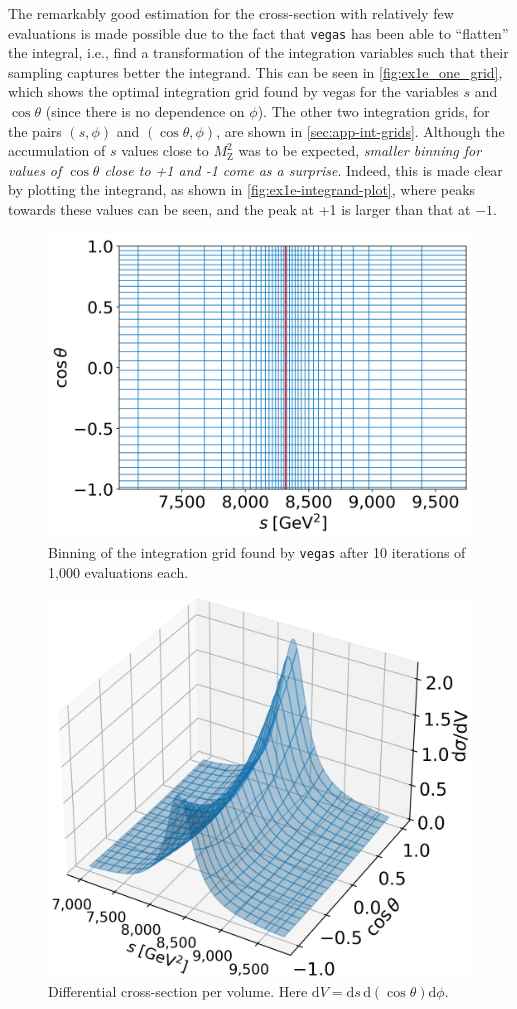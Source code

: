 The remarkably good estimation for the cross-section with relatively few evaluations is made possible due to the fact that \texttt{vegas} has been able to “flatten” the integral, i.e., find a transformation of the integration variables such that their sampling captures better the integrand. This can be seen in \autoref{fig:ex1e_one_grid}, which shows the optimal integration grid found by vegas for the variables $s$ and $\cos{\theta}$ (since there is no dependence on $\phi$). The other two integration grids, for the pairs $(s, \phi)$ and $(\cos{\theta}, \phi)$, are shown in \autoref{sec:app-int-grids}. Although the accumulation of $s$ values close to $M_{\text{Z}}^{2}$ was to be expected,  \emph{smaller binning for values of $\cos{\theta}$ close to +1 and -1 come as a surprise}. Indeed, this is made clear by plotting the integrand, as shown in \autoref{fig:ex1e-integrand-plot}, where peaks towards these values can be seen, and the peak at +1 is larger than that at $-1$.

\begin{figure}[ht!]
    \centering
    \includegraphics[width=0.6\linewidth]{figures/integration_grid_0.png}
    \caption{Binning of the integration grid found by \texttt{vegas} after 10 iterations of 1,000 evaluations each.}
    \label{fig:ex1e_one_grid}
\end{figure}

\begin{figure}
    \centering
    \includegraphics[width=0.6\linewidth]{figures/integrand_plot.png}
    \caption{Differential cross-section per volume. Here $\mathrm{d}V = \mathrm{d}s \, \mathrm{d}(\cos{\theta}) \mathrm{d}\phi$.}
    \label{fig:ex1e-integrand-plot}
\end{figure}


